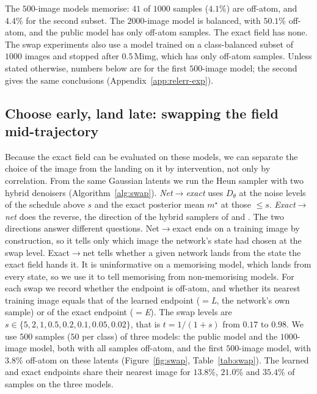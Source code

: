 \documentclass{article} %
\theoremstyle{plain}
\theoremstyle{definition}
\theoremstyle{remark}
\begin{document}
The $500$-image models memorise: $41$ of $1000$ samples ($4.1\%$) are off-atom, and $4.4\%$ for the
second subset. The $2000$-image model is balanced, with $50.1\%$ off-atom, and the public model has
only off-atom samples. The exact field has none. The swap experiments also use a model trained on a
class-balanced subset of $1000$ images and stopped after $0.5$\,Mimg, which has only off-atom
samples. Unless stated otherwise, numbers below are for the first $500$-image model; the second
gives the same conclusions (Appendix~\ref{app:relerr-exp}).

\subsection{Choose early, land late: swapping the field mid-trajectory}
\label{sec:swap}

Because the exact field can be evaluated on these models, we can separate the choice of the image
from the landing on it by intervention, not only by correlation. From the same Gaussian latents we
run the Heun sampler with two hybrid denoisers (Algorithm~\ref{alg:swap}). \emph{Net$\to$exact} uses $D_\theta$ at the noise
levels of the schedule above $s$ and the exact posterior mean $m^\star$ at those $\le s$.
\emph{Exact$\to$net} does the reverse, the direction of the hybrid samplers of
\citet{bertrand2025closed} and \citet{liu2025navigation}. The two directions answer different
questions. Net$\to$exact ends on a training image by construction, so it tells only which image the
network's state had chosen at the swap level. Exact$\to$net tells whether a given network lands from
the state the exact field hands it. It is uninformative on a memorising model, which lands from
every state, so we use it to tell memorising from non-memorising models. For each swap we record
whether the endpoint is off-atom, and whether its nearest training image equals that of the learned
endpoint (\emph{$=$L}, the network's own sample) or of the exact endpoint (\emph{$=$E}). The swap
levels are $s\in\{5,2,1,0.5,0.2,0.1,0.05,0.02\}$, that is $t=1/(1+s)$ from $0.17$ to $0.98$. We use
$500$ samples ($50$ per class) of three models: the public model and the $1000$-image model, both
with all samples off-atom, and the first $500$-image model, with $3.8\%$ off-atom on these latents
(Figure~\ref{fig:swap}, Table~\ref{tab:swap}). The learned and exact endpoints share their nearest
image for $13.8\%$, $21.0\%$ and $35.4\%$ of samples on the three models.
\end{document}
